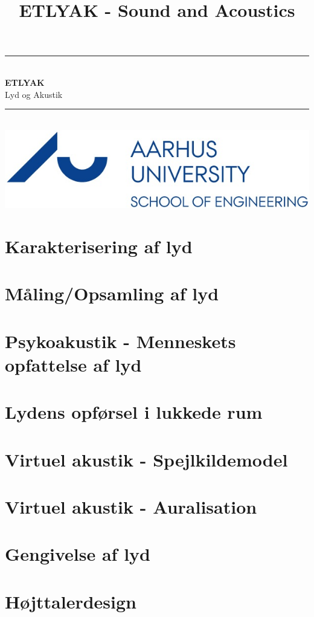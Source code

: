 \documentclass[12pt,a4paper,danish,oneside]{book}
\title{ETLYAK - Sound and Acoustics}
\newcommand{\HRule}{\rule{\linewidth}{0.5mm}}
\begin{document}
\begin{titlepage}
	\clearpage\thispagestyle{empty}

	\begin{center}
		\HRule \\[0.4cm]
		{\huge \bfseries ETLYAK} \\[.3cm] {\huge Lyd og Akustik}\\[0cm]		
		\HRule \\[3.4cm]
		\includegraphics[width=0.5\linewidth]{graphics/au}
	\end{center}
	\renewcommand{\contentsname}{Indholdsfortegnelse}
	\tableofcontents

\end{titlepage}
 
\listoffixmes

\chapter{Karakterisering af lyd}


\chapter{Måling/Opsamling af lyd}


\chapter{Psykoakustik - Menneskets opfattelse af lyd}


\chapter{Lydens opførsel i lukkede rum}


\chapter{Virtuel akustik - Spejlkildemodel}


\chapter{Virtuel akustik - Auralisation}


\chapter{Gengivelse af lyd}


\chapter{Højttalerdesign}

\end{document}
